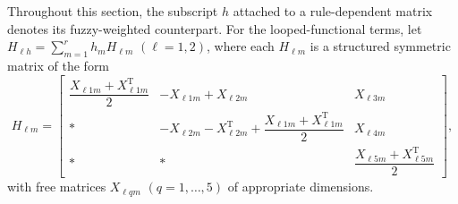 \documentclass[preprint,review,fleqn,sort&compress,3p]{elsarticle}
\theoremstyle{definition} %
\theoremstyle{definition}%
\begin{document}
	Throughout this section, the subscript $h$ attached to a rule-dependent matrix denotes its fuzzy-weighted counterpart. For the looped-functional terms, let $H_{\ell h}=\sum_{m=1}^{r}h_mH_{\ell m}$ $(\ell=1,2)$, where each $H_{\ell m}$ is a structured symmetric matrix of the form
	\begin{equation}\label{eq:H_structure}
		H_{\ell m}=
		\begin{bmatrix}
			\dfrac{X_{\ell 1m}+X_{\ell 1m}^{\mathrm T}}{2}
			&
			-X_{\ell 1m}+X_{\ell 2m}
			&
			X_{\ell 3m}
			\\[1.2ex]
			*
			&
			-X_{\ell 2m}-X_{\ell 2m}^{\mathrm T}
			+\dfrac{X_{\ell 1m}+X_{\ell 1m}^{\mathrm T}}{2}
			&
			X_{\ell 4m}
			\\[1.2ex]
			*
			&
			*
			&
			\dfrac{X_{\ell 5m}+X_{\ell 5m}^{\mathrm T}}{2}
		\end{bmatrix},
	\end{equation}
	with free matrices $X_{\ell qm}$ $(q=1,\ldots,5)$ of appropriate dimensions.
\end{document}
